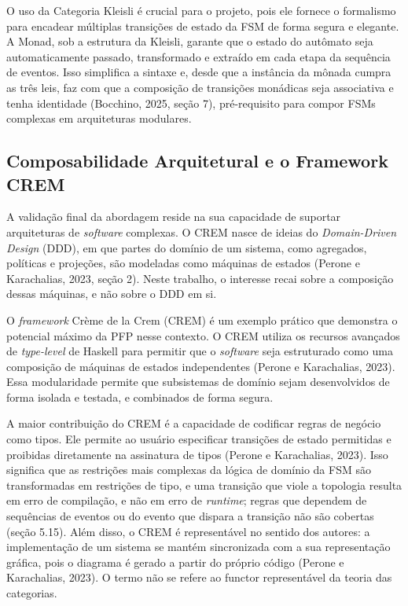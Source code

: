 \documentclass[12pt,a4paper]{article}
\begin{document}
O uso da Categoria Kleisli é crucial para o projeto, pois ele fornece o formalismo para encadear múltiplas transições de estado da FSM de forma segura e elegante. A Monad, sob a estrutura da Kleisli, garante que o estado do autômato seja automaticamente passado, transformado e extraído em cada etapa da sequência de eventos. Isso simplifica a sintaxe e, desde que a instância da mônada cumpra as três leis, faz com que a composição de transições monádicas seja associativa e tenha identidade (Bocchino, 2025, seção 7), pré-requisito para compor FSMs complexas em arquiteturas modulares.

\subsection{Composabilidade Arquitetural e o Framework CREM}

A validação final da abordagem reside na sua capacidade de suportar arquiteturas de \textit{software} complexas. O CREM nasce de ideias do \textit{Domain-Driven Design} (DDD), em que partes do domínio de um sistema, como agregados, políticas e projeções, são modeladas como máquinas de estados (Perone e Karachalias, 2023, seção 2). Neste trabalho, o interesse recai sobre a composição dessas máquinas, e não sobre o DDD em si.

O \textit{framework} Crème de la Crem (CREM) é um exemplo prático que demonstra o potencial máximo da PFP nesse contexto. O CREM utiliza os recursos avançados de \textit{type-level} de Haskell para permitir que o \textit{software} seja estruturado como uma composição de máquinas de estados independentes (Perone e Karachalias, 2023). Essa modularidade permite que subsistemas de domínio sejam desenvolvidos de forma isolada e testada, e combinados de forma segura.

A maior contribuição do CREM é a capacidade de codificar regras de negócio como tipos. Ele permite ao usuário especificar transições de estado permitidas e proibidas diretamente na assinatura de tipos (Perone e Karachalias, 2023). Isso significa que as restrições mais complexas da lógica de domínio da FSM são transformadas em restrições de tipo, e uma transição que viole a topologia resulta em erro de compilação, e não em erro de \textit{runtime}; regras que dependem de sequências de eventos ou do evento que dispara a transição não são cobertas (seção 5.15). Além disso, o CREM é representável no sentido dos autores: a implementação de um sistema se mantém sincronizada com a sua representação gráfica, pois o diagrama é gerado a partir do próprio código (Perone e Karachalias, 2023). O termo não se refere ao functor representável da teoria das categorias.
\end{document}
